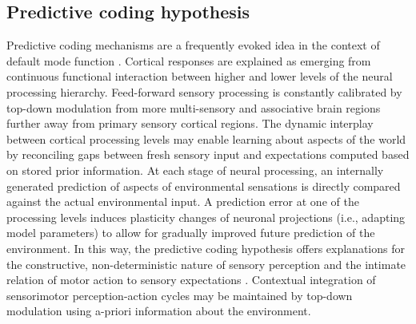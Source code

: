 \documentclass[10pt,letterpaper]{article}
\begin{document}
\subsection{Predictive coding hypothesis}
Predictive coding mechanisms
\citep{clark2013whatever, friston2008hierarchical}
are a frequently evoked idea in the context of default mode function
\citep{bar2007}.
Cortical responses are explained as
emerging from continuous functional interaction between
higher and lower levels of the neural processing hierarchy.
Feed-forward sensory processing is constantly calibrated by
top-down modulation from more multi-sensory and associative brain regions
further away from primary sensory cortical regions.
The dynamic interplay between cortical processing levels
may enable learning about aspects of the world by reconciling
gaps between fresh sensory input and expectations computed
based on stored prior information.
At each stage of neural processing,
an internally generated prediction of aspects of environmental sensations is
directly compared against the actual environmental input.
A prediction error at one of the processing levels
induces plasticity changes of neuronal projections
(i.e., adapting model parameters)
to allow for gradually improved future prediction of the environment.
In this way,
the predictive coding hypothesis offers explanations for
the constructive, non-deterministic nature of sensory perception
\citep{friston2010free, buzsaki2006rhythms} and
the intimate relation of motor action to sensory expectations
\citep{wolpert1995internal, kording2004bayesian}.
Contextual integration of sensorimotor perception-action cycles
may be maintained by top-down modulation
using a-priori information about the environment.
\end{document}
